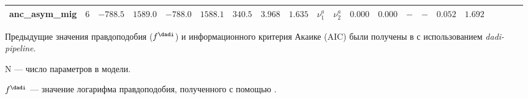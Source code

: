 \begin{landscape}
\begin{table}
{\begin{tabular}{lcccccccccccccccccccc}
anc\_asym\_mig & $6$ & $-788.5$ & $1589.0$ & $\mathbf{-788.0}$ & $1588.1$ & %
$340.5$ & $3.968$ & $1.635$ & $\nu_1^a$ & $\nu_2^a$ & $0.000$ & $0.000$ & $-$ & $-$ & $0.052$ & $1.692$\\
\hline
\end{tabular}%
}
\begin{tablenotes}
\item Предыдущие значения правдоподобия ($f^{\text{\dadi}}$) и информационного критерия Акаике (AIC) были получены в \cite{portik2017evaluating} с использованием \textit{dadi-pipeline}.
\item N --- число параметров в модели.
\item $f^\text{\dadi}$ --- значение логарифма правдоподобия, полученного с помощью \dadi.
\end{tablenotes}
\label{tab:app1:nor_sou}
\end{table}



\end{landscape}
